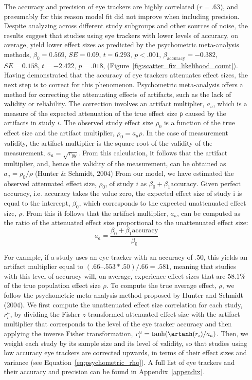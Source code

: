 \documentclass{article}
\newcommand{\SE}{\mathit{SE}}
\begin{document}
The accuracy and precision of eye trackers are highly correlated ($r = .63$), and presumably for this reason model fit did not improve when including precision. Despite analyzing across different study subgroups and other sources of noise, the results suggest that studies using eye trackers with lower levels of accuracy, on average, yield lower effect sizes as predicted by the psychometric meta-analysis methods, $\beta_0 = 0.569$, $\SE = 0.09$, $t = 6.293$, $p < .001$, $\beta_{\textrm{accuracy}} = -0.382$, $\SE = 0.158$, $t = -2.422$, $p = .018$, (Figure~\ref{fig:scatter_fix_likelihood_count}). Having demonstrated that the accuracy of eye trackers attenuates effect sizes, the next step is to correct for this phenomenon. Psychometric meta-analysis offers a method for correcting the attenuating effects of artifacts, such as the lack of validity or reliability. The correction involves an artifact multiplier, $a_a$, which is a measure of the expected attenuation of the true effect size ρ caused by the artifacts in study $i$. The observed study effect size $\rho_0$ is a function of the true effect size and the artifact multiplier, $\rho_0 = a_a \rho$. In the case of measurement validity, the artifact multiplier is the square root of the validity of the measurement, $a_a = \sqrt{r_{yy}}$. From this calculation, it follows that the artifact multiplier, and, hence the validity of the measurement, can be obtained as $a_a = \rho_0 / \rho$ (Hunter & Schmidt, 2004) From our model, we have estimated the observed attenuated effect size, $\rho_0$, of study $i$ as $\beta_0 + \beta_1 \textrm{accuracy}$. Given perfect accuracy, i.e. accuracy takes the value zero, the expected effect size of study i is equal to the intercept, $\beta_0$, which corresponds to the expected unattenuated effect size, $\rho$. From this it follows that the artifact multiplier, $a_a$, can be computed as the ratio of the attenuated effect size proportional to the unattenuated effect size:
%
\begin{equation}
\label{eq:artifact_multiplier}
a_a = \frac{\beta_0 + \beta_1 \textrm{accuracy}}{\beta_0}
\end{equation}

For example, if a study uses an eye tracker with an accuracy of $.50$, this yields an artifact multiplier equal to $(.66 – .553*.50)/.66 = .581$, meaning that studies with this level of accuracy will, on average, experience effect sizes that are $58.1\%$ of the true population effect size $\rho$. To compute the true average effect, $\rho$, we follow the psychometric meta-analysis method proposed by Hunter and Schmidt (2004). We first compute the unattenuated effect size correlation for each study, $r_i^u$, by dividing the Fisher $z$ transformed attenuated effect size with the artifact multiplier that corresponds to the level of the eye tracker accuracy and then applying the inverse Fisher transformation, $r_i^u = \tanh(\artanh(r_i)/a_a)$. Then, we weight each study by its sample size and its level of validity, so that studies using low accuracy eye trackers are corrected upwards, in terms of their effect sizes and variance (see Equation~\ref{eq:psychometric_rho}). A full list of eye trackers and their accuracy and precision can be found in Appendix~\ref{appendix}.
\end{document}
